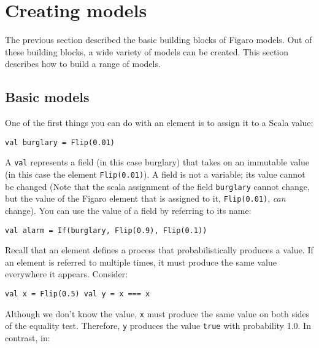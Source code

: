 
\chapter{Creating models} %

\label{Creating models} %

The previous section described the basic building blocks of Figaro models. Out of these building blocks, a wide variety of models can be created. This section describes how to build a range of models.

\section{Basic models}

One of the first things you can do with an element is to assign it to a Scala value:

\begin{flushleft}
\texttt{val burglary = Flip(0.01)}
\end{flushleft}


A \texttt{val} represents a field (in this case burglary) that takes on an immutable value (in this case the element \texttt{Flip(0.01)}). A field is not a variable; its value cannot be changed (Note that the scala assignment of the field \texttt{burglary} cannot change, but the value of the Figaro element that is assigned to it, \texttt{Flip(0.01)}, \emph{can} change). You can use the value of a field by referring to its name:

\begin{flushleft}
\texttt{val alarm = If(burglary, Flip(0.9), Flip(0.1))}
\end{flushleft}

Recall that an element defines a process that probabilistically produces a value. If an element is referred to multiple times, it must produce the same value everywhere it appears. Consider:

\begin{flushleft}
\texttt{val x = Flip(0.5)
\newline val y = x === x}
\end{flushleft}

Although we don't know the value, \texttt{x} must produce the same value on both sides of the equality test. Therefore, \texttt{y} produces the value \texttt{true} with probability 1.0. In contrast, in:

